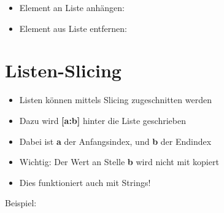 \begin{frame}
    \slidehead
    \begin{itemize}
        \item Element an Liste anhängen:
            \pause
        \item Element aus Liste entfernen:
    \end{itemize}
\end{frame}

\livecoding

%
\subtitle{Kapitel 5: ganz viele variablen in einer}


\section{Listen-Slicing}
\begin{frame}
    \slidehead
    \begin{itemize}
        \item Listen können mittels Slicing zugeschnitten werden
            \pause
        \item Dazu wird \textbf{[a:b]} hinter die Liste geschrieben
        \item Dabei ist \textbf{a} der Anfangsindex, und \textbf{b} der Endindex
            \pause
        \item Wichtig: Der Wert an Stelle \textbf{b} wird nicht mit kopiert
        \item Dies funktioniert auch mit Strings!
    \end{itemize}
    \pause

    \begin{block}{Beispiel:}
    \end{block}
\end{frame}

